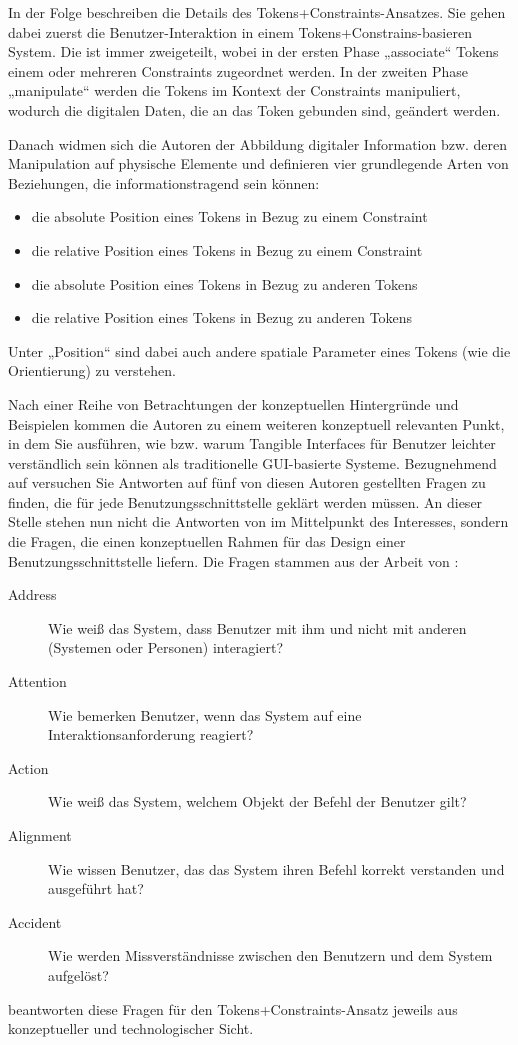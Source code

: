 In der Folge beschreiben \citeauthor{Ullmer05} die Details des Tokens+Constraints-Ansatzes. Sie gehen dabei zuerst die Benutzer-Interaktion in einem Tokens+Constrains-basieren System. Die ist immer zweigeteilt, wobei in der ersten Phase „associate“ Tokens einem oder mehreren Constraints zugeordnet werden. In der zweiten Phase „manipulate“ werden die Tokens im Kontext der Constraints manipuliert, wodurch die digitalen Daten, die an das Token gebunden sind, geändert werden.

Danach widmen sich die Autoren der Abbildung digitaler Information bzw. deren Manipulation auf physische Elemente und definieren vier grundlegende Arten von Beziehungen, die informationstragend sein können:
\begin{itemize}
	\item die absolute Position eines Tokens in Bezug zu einem Constraint
	\item die relative Position eines Tokens in Bezug zu einem Constraint
	\item die absolute Position eines Tokens in Bezug zu anderen Tokens
	\item die relative Position eines Tokens in Bezug zu anderen Tokens
\end{itemize}
Unter „Position“ sind dabei auch andere spatiale Parameter eines Tokens (wie die Orientierung) zu verstehen.

Nach einer Reihe von Betrachtungen der konzeptuellen Hintergründe und Beispielen kommen die Autoren zu einem weiteren konzeptuell relevanten Punkt, in dem Sie ausführen, wie bzw. warum Tangible Interfaces für Benutzer leichter verständlich sein können als traditionelle \gls{GUI}-basierte Systeme. Bezugnehmend auf \citet{Bellotti02} versuchen Sie Antworten auf fünf von diesen Autoren gestellten Fragen zu finden, die für jede Benutzungsschnittstelle geklärt werden müssen. An dieser Stelle stehen nun nicht die Antworten von \citeauthor{Ullmer05} im Mittelpunkt des Interesses, sondern die Fragen, die einen konzeptuellen Rahmen für das Design einer Benutzungsschnittstelle liefern. Die Fragen stammen aus der Arbeit von \citet{Bellotti02}:
\begin{description}
	\item[Address] Wie weiß das System, dass Benutzer mit ihm und nicht mit anderen (Systemen oder Personen) interagiert?
	\item[Attention] Wie bemerken Benutzer, wenn das System auf eine Interaktionsanforderung reagiert? 
	\item[Action] Wie weiß das System, welchem Objekt der Befehl der Benutzer gilt?
	\item[Alignment] Wie wissen Benutzer, das das System ihren Befehl korrekt verstanden und ausgeführt hat?
	\item[Accident] Wie werden Missverständnisse zwischen den Benutzern und dem System aufgelöst?
\end{description}
\citeauthor{Ullmer05} beantworten diese Fragen für den Tokens+Constraints-Ansatz jeweils aus konzeptueller und technologischer Sicht. 

